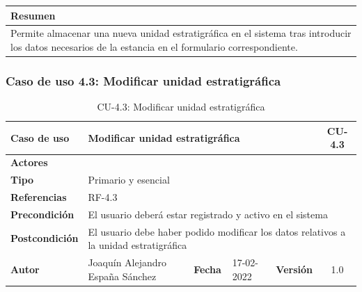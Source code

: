     \begin{table}[H]
        \centering
        \begin{tabularx}{\textwidth}{@{} |L |@{}} \hline
            \textbf{Resumen} \\
            \hline
            Permite almacenar una nueva unidad estratigráfica en el sistema tras introducir
            los datos necesarios de la estancia en el formulario correspondiente.\\
            \hline
        \end{tabularx}
    \end{table}

\subsubsection{Caso de uso 4.3: Modificar unidad estratigráfica}

    \begin{table}[H]
    \begin{center}
        \begin{adjustbox}{width=\textwidth}
        \begin{tabular}{ | l | l | l | l | c | c | } 
            \hline
            \textbf{Caso de uso} & \multicolumn{4}{l|}{Modificar unidad estratigráfica} & \cellcolor{gray!50} \textbf{CU-4.3}\\
            \hline
            \textbf{Actores} & \multicolumn{5}{p{0.9\linewidth}|}{ } \\
            \hline
            \textbf{Tipo} & \multicolumn{5}{l|}{Primario y esencial} \\
            \hline
            \textbf{Referencias} & \multicolumn{3}{l|}{RF-4.3} & \multicolumn{2}{l|}{ }\\
            \hline
            \textbf{Precondición} & \multicolumn{5}{l|}{El usuario deberá estar registrado y activo en el sistema} \\
            \hline
            \textbf{Postcondición} & \multicolumn{5}{l|}{El usuario debe haber podido modificar los datos relativos a la
            unidad estratigráfica} \\
            \hline
            \textbf{Autor} & \multicolumn{1}{p{0.25\linewidth}|}{Joaquín Alejandro España Sánchez} & \textbf{Fecha} & 
            17-02-2022     & \textbf{Versión}                                                      & 1.0\\
            \hline
        \end{tabular}
        \end{adjustbox}
        \caption{CU-4.3: Modificar unidad estratigráfica}
        \label{tab:modify-ue}
    \end{center}
    \end{table}

